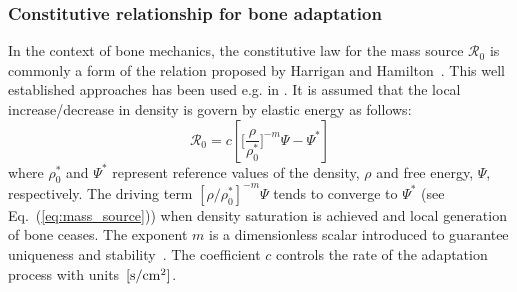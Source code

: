 \documentclass[twocolumn]{svjour3}
\begin{document}
\subsubsection{Constitutive relationship for bone adaptation}

\label{sec:constitutive_eq}

In the context of bone mechanics, the constitutive law for the mass source $\mathcal{R}_{0}$ is commonly a form of the relation proposed by Harrigan and Hamilton~\cite{Harrigan1993}. This well established approaches has been used e.g. in \citep{harrigan1996bone, taylor2009phenomenon, pang2012computational, hambli2013integrated}. 
It is assumed that the local increase/decrease in density is govern by elastic energy as follows:
\begin{equation}
\mathcal{R}_{0}=c\left[\Biggl[\frac{\rho}{\rho_{0}^{\ast}}\Biggr]^{-m}\Psi
-\Psi^{\ast}\right]
\label{eq:mass_source}
\end{equation}
where $\rho_0^\ast$ and $\Psi^\ast$ represent reference values of the
density, $\rho$ and free energy, $\Psi$, respectively. The driving term
$\left[ \rho / \rho_0^\ast \right]^{-m}\Psi$ tends to converge to
$\Psi^\ast$ (see Eq.~(\ref{eq:mass_source})) when density saturation is
achieved and local generation of bone ceases. The exponent $m$ is a
dimensionless scalar introduced to guarantee uniqueness and
stability~\cite{Harrigan1993}. The coefficient $c$ controls
the rate of the adaptation process with units~$[\rm{s/cm^2}]$. 
% 		
\end{document}
